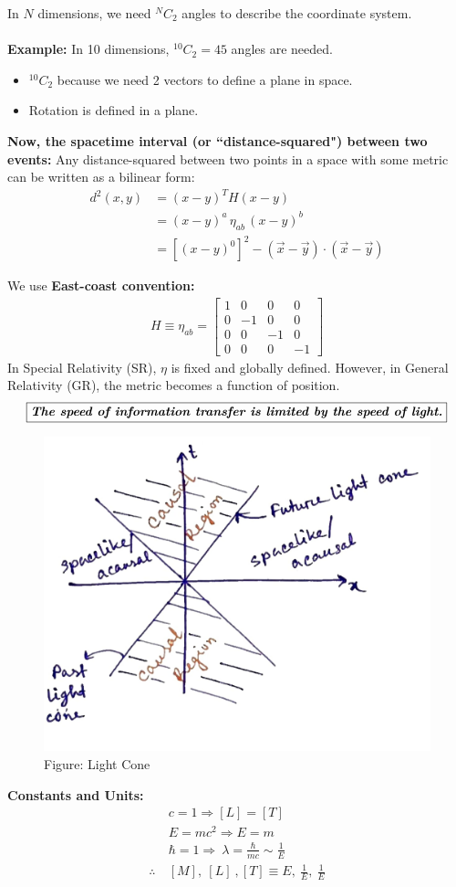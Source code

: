 \documentclass[14pt]{article} %
\begin{document}
In $N$ dimensions, we need ${}^NC_2$ angles to describe the coordinate system. \\ \\
\noindent
\textbf{Example:} In 10 dimensions, $ {}^{10}C_2 = 45 $ angles are needed.
\begin{itemize}
    \item $ {}^{10}C_2 $ because we need 2 vectors to define a plane in space.
    \item Rotation is defined in a plane.
\end{itemize}
\textbf{Now, the spacetime interval (or ``distance-squared") between two events:}
Any distance-squared between two points in a space with some metric can be written as a bilinear form:
\begin{align*}
    d^2(x, y) &= (x - y)^T H (x - y) \\
    &= (x - y)^a \, \eta_{ab} \, (x - y)^b \\
    &= [(x - y)^0]^2 - (\vec{x} - \vec{y}) \cdot (\vec{x} - \vec{y})
\end{align*}

We use \textbf{East-coast convention:}
\begin{align*}
H \equiv \eta_{ab} = 
\begin{bmatrix}
1 & 0 & 0 & 0 \\
0 & -1 & 0 & 0 \\
0 & 0 & -1 & 0 \\
0 & 0 & 0 & -1
\end{bmatrix}
\end{align*}
In Special Relativity (SR), $\eta$ is fixed and globally defined. However, in General Relativity (GR), the metric becomes a function of position.
\vspace{0.5cm}
$$\fbox{\textbf{\textit{The speed of information transfer is limited by the speed of light.}}}$$
\begin{figure}[H]
\centering
\includegraphics[width=0.6\linewidth]{L(-1)_4.jpg}
\caption*{Figure: Light Cone}
\end{figure}
\textbf{Constants and Units:}
\begin{align*}
   & c = 1  \Rightarrow  [L] = [T] \\
   & E = mc^2 \Rightarrow E = m \\
   & \hbar = 1 \Rightarrow ~ \lambda = \frac{\hbar}{mc} \sim \frac{1}{E} \\
   \therefore~ &[M],~[L]~,[T] \equiv E,~ \frac{1}{E},~ \frac{1}{E}
\end{align*}
\end{document}
